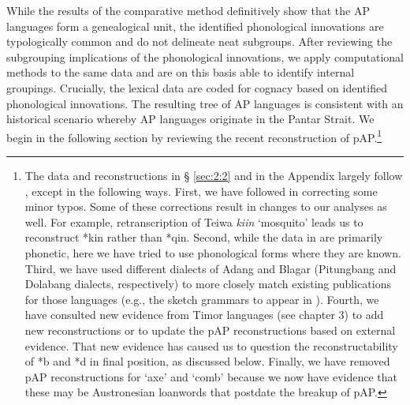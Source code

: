 While the results of the comparative method definitively show that the AP languages form a genealogical unit, the identified phonological innovations are typologically common and do not delineate neat subgroups. After reviewing the subgrouping implications of the phonological innovations, we apply computational methods to the same data and are on this basis able to identify internal groupings. Crucially, the lexical data are coded for cognacy based on identified phonological innovations. The resulting tree of AP languages is consistent with an historical scenario whereby AP languages originate in the Pantar Strait. We begin in the following section by reviewing the recent reconstruction of pAP.\footnote{The data and reconstructions in {\S} \ref{sec:2:2} and in the Appendix largely follow \citet{HoltonEtAl2012}, except in the following ways. First, we have followed \citet{RobinsonEtAl2012internal} in correcting some minor typos. Some of these corrections result in changes to our analyses as 
well. For example, retranscription of Teiwa \textit{ki{\textglotstop}in }`mosquito' leads us to reconstruct *kin rather than *qin. Second, while the data in \citet{HoltonEtAl2012} are primarily phonetic, here we have tried to use phonological forms where they are known. Third, we have used different dialects of Adang and Blagar (Pitungbang and Dolabang dialects, respectively) to more closely match existing publications for those languages (e.g., the sketch grammars to appear in \citealt{Schappertasketchgrammars}). Fourth, we have consulted new evidence from Timor languages (see chapter 3) to add new reconstructions or to update the pAP reconstructions based on external evidence. That new evidence has caused us to question the reconstructability of *b and *d in final position, as discussed below. Finally, we have removed pAP reconstructions for `axe' and `comb' because we now have evidence that these may be Austronesian loanwords that postdate the breakup of pAP.} 

